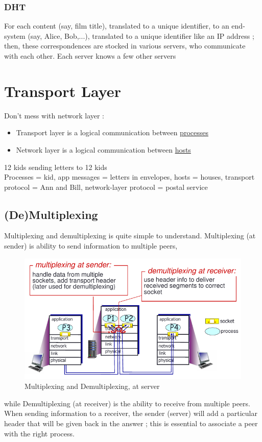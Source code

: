 \documentclass[12pt,a4paper]{article}
\begin{document}
\subsubsection{DHT}
For each content (say, film title), translated to a unique identifier, to an end-system (say, Alice, Bob,...), translated to a unique identifier like an IP address ; then, these correspondences are stocked in various servers, who communicate with each other. Each server knows a few other servers 

\section{Transport Layer}
Don't mess with network layer : 
\begin{itemize}
	\item 	Transport layer is a logical communication between \uline{processes}
	\item 	Network layer is a logical communication between \uline{hosts}
\end{itemize}
 12 kids sending letters to 12 kids \\
Processes = kid, app messages = letters in envelopes, hosts = houses, transport protocol = Ann and Bill, network-layer protocol = postal service
\subsection{(De)Multiplexing}
Multiplexing and demultiplexing is quite simple to understand. Multiplexing (at sender) is ability to send information to multiple peers,
\begin{figure}[h]
	\centering
	\includegraphics[scale=0.6]{images/multi_demulti}
	\caption{Multiplexing and Demultiplexing, at server}
	\label{fig: multi/demulti}
\end{figure}
while Demultiplexing (at receiver) is the ability to receive from multiple peers. When sending information to a receiver, the sender (server) will add a particular header that will be given back in the answer ; this is essential to associate a peer with the right process.
\end{document}
